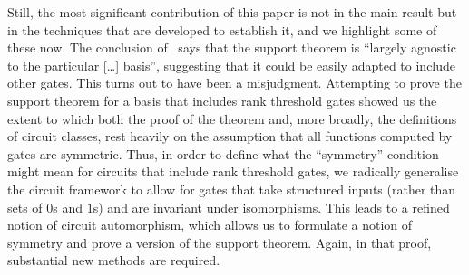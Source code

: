 \documentclass[../paper.tex]{subfiles}
\begin{document}


Still, the most significant contribution of this paper is not in the main result
but in the techniques that are developed to establish it, and we
highlight some of these now.  The
conclusion of~\cite{AndersonD17} says that the support theorem is
``largely agnostic to the particular [\ldots] basis'', suggesting that
it could be easily adapted to include other gates.  This turns out to
have been a misjudgment.  Attempting to prove the support theorem for
a basis that includes rank threshold gates showed us the extent to
which both the proof of the theorem and, more broadly, the definitions
of circuit classes, rest heavily on the assumption that all functions
computed by gates are symmetric.  Thus, in order to define what the
``symmetry'' condition might mean for circuits that include rank
threshold gates, we radically generalise the circuit framework to allow
for gates that take structured inputs (rather than sets of $0$s
and $1$s) and are invariant under isomorphisms.  This leads to a
refined notion of circuit automorphism, which allows us to formulate a
notion of symmetry and prove a version of the support theorem.  Again,
in that proof, substantial new methods are required.
\end{document}
